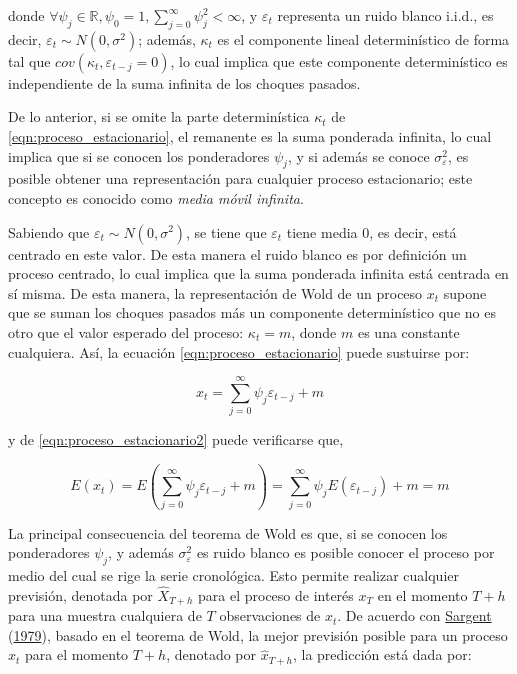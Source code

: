 \documentclass[
]{article}
\begin{document}
donde
\(\forall \psi_j \in \mathbb{R}, \psi_0=1, \sum_{j=0}^{\infty} \psi_j^2<\infty\),
y \(\varepsilon_t\) representa un ruido blanco i.i.d., es decir,
\(\varepsilon_t \sim N(0, \sigma^2)\); además, \(\kappa_t\) es el
componente lineal determinístico de forma tal que
\(cov(\kappa_t,\varepsilon_{t-j}=0)\), lo cual implica que este
componente determinístico es independiente de la suma infinita de los
choques pasados.

De lo anterior, si se omite la parte determinística \(\kappa_t\) de
\ref{eqn:proceso_estacionario}, el remanente es la suma ponderada
infinita, lo cual implica que si se conocen los ponderadores \(\psi_j\),
y si además se conoce \(\sigma_\varepsilon^2\), es posible obtener una
representación para cualquier proceso estacionario; este concepto es
conocido como \emph{media móvil infinita}.

Sabiendo que \(\varepsilon_t \sim N(0, \sigma^2)\), se tiene que
\(\varepsilon_t\) tiene media 0, es decir, está centrado en este valor.
De esta manera el ruido blanco es por definición un proceso centrado, lo
cual implica que la suma ponderada infinita está centrada en sí misma.
De esta manera, la representación de Wold de un proceso \(x_t\) supone
que se suman los choques pasados más un componente determinístico que no
es otro que el valor esperado del proceso: \(\kappa_t=m\), donde \(m\)
es una constante cualquiera. Así, la ecuación
\ref{eqn:proceso_estacionario} puede sustuirse por:

\begin{equation}
\label{eqn:proceso_estacionario2}
x_t=\sum_{j=0}^{\infty} \psi_j\varepsilon_{t-j}+m
\end{equation}

y de \ref{eqn:proceso_estacionario2} puede verificarse que,

\begin{equation}
\label{eqn:dem_proceso_estacionario2}
E(x_t)=E\left(\sum_{j=0}^{\infty} \psi_j\varepsilon_{t-j}+m\right)=\sum_{j=0}^{\infty} \psi_jE\left(\varepsilon_{t-j}\right) + m = m
\end{equation}

La principal consecuencia del teorema de Wold es que, si se conocen los
ponderadores \(\psi_j\), y además \(\sigma_\varepsilon^2\) es ruido
blanco es posible conocer el proceso por medio del cual se rige la serie
cronológica. Esto permite realizar cualquier previsión, denotada por
\(\hat X_{T+h}\) para el proceso de interés \(x_T\) en el momento
\(T+h\) para una muestra cualquiera de \(T\) observaciones de \(x_t\).
De acuerdo con \protect\hyperlink{ref-sargent_macro}{Sargent}
(\protect\hyperlink{ref-sargent_macro}{1979}), basado en el teorema de
Wold, la mejor previsión posible para un proceso \(x_t\) para el momento
\(T+h\), denotado por \(\hat x_{T+h}\), la predicción está dada por:
\end{document}
